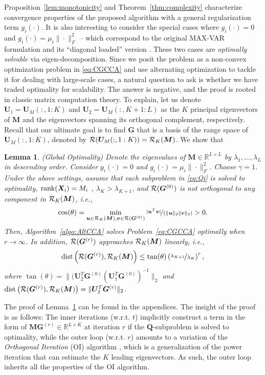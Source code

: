 \documentclass[10pt,journal]{IEEEtran}
\newtheorem{Lemma}{Lemma}
\newcommand{\Q}{\boldsymbol{Q}}
\begin{document}
Proposition~\ref{lem:monotonicity} and Theorem~\ref{thm:complexity} characterize convergence properties of the proposed algorithm with a general regularization term $g_i(\cdot)$.
It is also interesting to consider the special cases where $g_i(\cdot)=0$ and $g_i(\cdot)=\mu_i\|\cdot\|_F^2$ -- which correspond to the original MAX-VAR formulation and its ``diagonal loaded'' version \cite{rastogimultiview}.
These two cases are \emph{optimally solvable} via eigen-decomposition.
Since we posit the problem as a non-convex optimization problem in \eqref{eq:CGCCA} and use alternating optimization to tackle it for dealing with large-scale cases, a natural question to ask is whether we have traded optimality for scalability.
The answer is negative, and the proof is rooted in classic matrix computation theory. 
To explain, let us denote ${\bm U}_1= {\bm U}_M(:,1:K)$ and ${\bm U}_2={\bm U}_M(:,K+1:L)$ as the $K$ principal eigenvectors of ${\bm M}$ and the eigenvectors spanning its orthogonal complement, respectively.
Recall that our ultimate goal is to find ${\bm G}$ that is a basis of the range space of ${\bm U}_M(:,1:K)$, denoted by ${\cal R}({\bm U}_M(:,1:K))={\cal R}_K({\bm M})$.
We show that
\begin{Lemma} \label{thm:main} ({Global Optimality})
   Denote the eigenvalues of ${\bm M}\in\mathbb{R}^{L\times L}$ by $\lambda_1,\ldots,\lambda_L$ in descending order. 
   Consider $g_i(\cdot)=0$ and $g_i(\cdot)=\mu_i\|\cdot\|_F^2$. Choose $\gamma = 1$.
   Under the above settings, assume that each subproblem in \eqref{eq:Qi} is solved to optimality, ${\rm rank}({\bm X}_i)=M_i$ , $\lambda_K>\lambda_{K+1}$, and ${\cal R}({\bm G}^{(0)})$ is not orthogonal to any component in ${\cal R}_K({\bm M})$, i.e., 
   \[\cos(\theta) = \min_{{\bm u}\in{\cal R}_K({\bm M}), {\bm v}\in{\cal R}({\bm G}^{(0)})}\nicefrac{|{\bm u}^T{\bm v}|}{(\|{\bm u}\|_2\|{\bm v}\|_2)}>0.\]
   Then, Algorithm~\eqref{algo:AltCCA} solves Problem~\eqref{eq:CGCCA} optimally when $r\rightarrow \infty$. In addition,
   ${\cal R}({\bm G}^{(r)})$ approaches ${\cal R}_K({\bm M})$ linearly, i.e.,
   \[ {\rm dist}\left({\cal R}({\bm G}^{(r)}),{\cal R}_K({\bm M})\right)\leq \tan(\theta)\left(\nicefrac{\lambda_{K+1}}{\lambda_K}\right)^r,\]
   where $\tan(\theta)=\|({\bm U}_2^T{\bm G}^{(0)}({\bm U}_1^T{\bm G}^{(0)})^{-1}\|_2$ and $ {\rm dist}\left({\cal R}({\bm G}^{(r)}),{\cal R}_K({\bm M})
   \right) = \|{\bm U}_2^T{\bm G}^{(r)}\|_2$.
\end{Lemma}
The proof of Lemma~\ref{thm:main} can be found in the appendices.
The insight of the proof is as follows: The inner iterations (w.r.t. $t$) implicitly construct a term in the form of ${\bm M}{\bm G}^{(r)}\in\mathbb{R}^{L\times K}$ at iteration $r$ if the $\Q$-subproblem is solved to optimality, while the outer loop (w.r.t. $r$) amounts to a variation of the \emph{Orthogonal Iteration} (OI) algorithm  \cite{GHGolub1996}, which is a generalization of the power iteration that can estimate the $K$ leading eigenvectors.
As such, the outer loop inherits all the properties of the OI algorithm.
\end{document}
